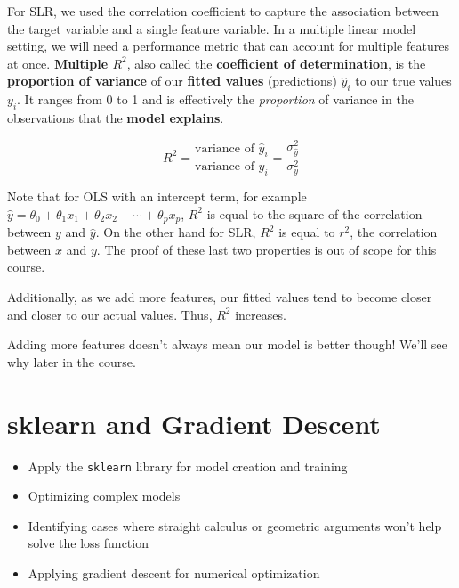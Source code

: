 \documentclass[
  letterpaper,
  DIV=11,
  numbers=noendperiod]{scrreprt}
\providecommand{\tightlist}{%
  \setlength{\itemsep}{0pt}\setlength{\parskip}{0pt}}\usepackage{longtable,booktabs,array}
\begin{document}
For SLR, we used the correlation coefficient to capture the association
between the target variable and a single feature variable. In a multiple
linear model setting, we will need a performance metric that can account
for multiple features at once. \textbf{Multiple \(R^2\)}, also called
the \textbf{coefficient of determination}, is the \textbf{proportion of
variance} of our \textbf{fitted values} (predictions) \(\hat{y}_i\) to
our true values \(y_i\). It ranges from 0 to 1 and is effectively the
\emph{proportion} of variance in the observations that the \textbf{model
explains}.

\[R^2 = \frac{\text{variance of } \hat{y}_i}{\text{variance of } y_i} = \frac{\sigma^2_{\hat{y}}}{\sigma^2_y}\]

Note that for OLS with an intercept term, for example
\(\hat{y} = \theta_0 + \theta_1x_1 + \theta_2x_2 + \cdots + \theta_px_p\),
\(R^2\) is equal to the square of the correlation between \(y\) and
\(\hat{y}\). On the other hand for SLR, \(R^2\) is equal to \(r^2\), the
correlation between \(x\) and \(y\). The proof of these last two
properties is out of scope for this course.

Additionally, as we add more features, our fitted values tend to become
closer and closer to our actual values. Thus, \(R^2\) increases.

Adding more features doesn't always mean our model is better though!
We'll see why later in the course.


\chapter{sklearn and Gradient
Descent}\label{sklearn-and-gradient-descent}

\begin{tcolorbox}[enhanced jigsaw, titlerule=0mm, bottomtitle=1mm, arc=.35mm, colframe=quarto-callout-note-color-frame, rightrule=.15mm, opacityback=0, opacitybacktitle=0.6, leftrule=.75mm, breakable, toprule=.15mm, colback=white, left=2mm, colbacktitle=quarto-callout-note-color!10!white, toptitle=1mm, bottomrule=.15mm, title=\textcolor{quarto-callout-note-color}{\faInfo}\hspace{0.5em}{Learning Outcomes}, coltitle=black]

\begin{itemize}
\tightlist
\item
  Apply the \texttt{sklearn} library for model creation and training
\item
  Optimizing complex models
\item
  Identifying cases where straight calculus or geometric arguments won't
  help solve the loss function
\item
  Applying gradient descent for numerical optimization
\end{itemize}

\end{tcolorbox}
\end{document}
